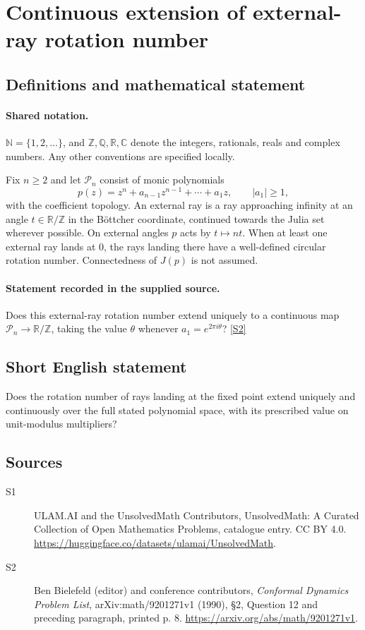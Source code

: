 \documentclass[11pt]{article}
\newcommand{\sref}[2]{\hyperlink{source:#1:#2}{[S#2]}}
\begin{document}
\section{Continuous extension of external-ray rotation number}\label{statement}

\subsection{Definitions and mathematical statement}

\paragraph{Shared notation.}$\mathbb N=\{1,2,\ldots\}$, and $\mathbb Z,\mathbb Q,\mathbb R,\mathbb C$ denote the integers, rationals, reals and complex numbers. Any other conventions are specified locally.


Fix $n\geq2$ and let $\mathcal P_n$ consist of monic polynomials
\[p(z)=z^n+a_{n-1}z^{n-1}+\cdots+a_1z,\qquad |a_1|\geq1,\]
with the coefficient topology. An external ray is a ray approaching infinity at an angle $t\in\mathbb R/\mathbb Z$ in the Böttcher coordinate, continued towards the Julia set wherever possible. On external angles $p$ acts by $t\mapsto nt$. When at least one external ray lands at $0$, the rays landing there have a well-defined circular rotation number. Connectedness of $J(p)$ is not assumed.
\paragraph{Statement recorded in the supplied source.}
Does this external-ray rotation number extend uniquely to a continuous map $\mathcal P_n\to\mathbb R/\mathbb Z$, taking the value $\theta$ whenever $a_1=e^{2\pi i\theta}$? \sref{statement}{2}
\subsection{Short English statement}
Does the rotation number of rays landing at the fixed point extend uniquely and continuously over the full stated polynomial space, with its prescribed value on unit-modulus multipliers?
\subsection{Sources}
\begin{description}
\item[\hypertarget{source:statement:1}{S1}] ULAM.AI and the UnsolvedMath Contributors, UnsolvedMath: A Curated Collection of Open Mathematics Problems, catalogue entry. CC BY 4.0. \url{https://huggingface.co/datasets/ulamai/UnsolvedMath}.
\item[\hypertarget{source:statement:2}{S2}] Ben Bielefeld (editor) and conference contributors, \emph{Conformal Dynamics Problem List}, arXiv:math/9201271v1 (1990), \S2, Question 12 and preceding paragraph, printed p. 8. \url{https://arxiv.org/abs/math/9201271v1}.
\end{description}
\label{end:statement}
\end{document}
